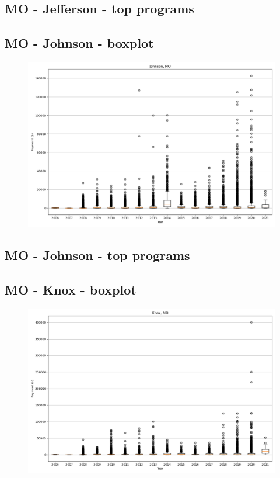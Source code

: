 \subsection*{MO - Jefferson - top programs}

\newpage
\subsection*{MO - Johnson - boxplot}
\begin{figure}[h]
\centering
\includegraphics[width=7in]{../output/boxplots/counties/Johnson-MO_boxplot.png}
\end{figure}


\subsection*{MO - Johnson - top programs}

\newpage
\subsection*{MO - Knox - boxplot}
\begin{figure}[h]
\centering
\includegraphics[width=7in]{../output/boxplots/counties/Knox-MO_boxplot.png}
\end{figure}


